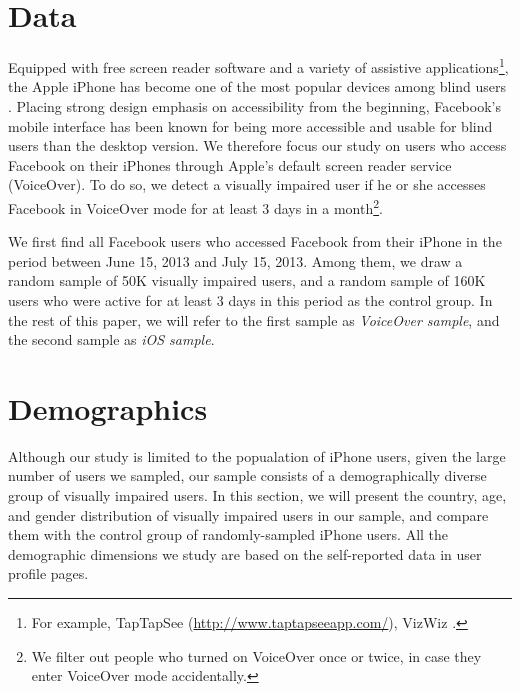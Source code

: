 \documentclass{sigchi}
\begin{document}


\section{Data}

Equipped with free screen reader software and  a variety of assistive applications\footnote{For example, TapTapSee (\url{http://www.taptapseeapp.com/}), VizWiz \cite{jayant2011}.}, the Apple iPhone has become one of the most popular devices among blind users \cite{brady2013chi}.  Placing strong design emphasis on accessibility from the beginning, Facebook's mobile interface has been known for being more accessible and usable for blind users than the desktop version\cite{wentz2011}.   We therefore focus our study on users who access Facebook on their iPhones through Apple's default screen reader service (VoiceOver). To do so, we detect a visually impaired user if he or she accesses Facebook in VoiceOver mode for at least 3 days in a month\footnote{We filter out people who turned on VoiceOver once or twice, in case they enter VoiceOver mode accidentally.}.  

We first find all Facebook users who accessed Facebook from their iPhone in the period between June 15, 2013 and July 15, 2013. Among them, we draw a random sample of 50K visually impaired users,  and a random sample of 160K users who were active for at least 3 days in this period as the control group. In the rest of this paper, we will refer to the first sample as \textit{VoiceOver sample}, and the second sample as \textit{iOS sample}.


\section{Demographics}
Although our study is limited to the popualation of iPhone users, given the large number of users we sampled, our sample consists of a demographically diverse group of visually impaired users. In this section, we will present the country, age, and gender distribution of visually impaired users in our sample, and compare them with the control group of randomly-sampled iPhone users. All the demographic dimensions we study are based on the self-reported data in user profile pages.
\end{document}

